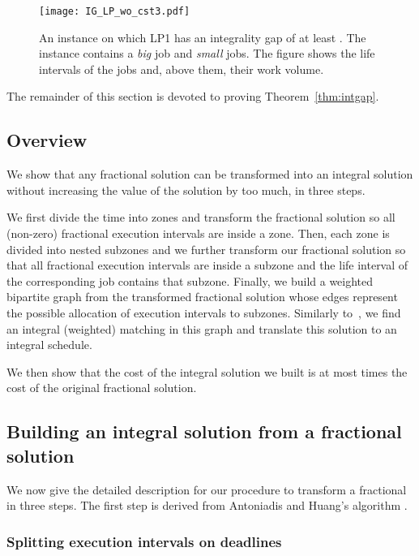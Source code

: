 \begin{figure}
   \begin{center}
        \texttt{[image: IG\_LP\_wo\_cst3.pdf]}
   \end{center}
   \caption{An instance on which LP1 has an integrality gap of at least .
   The instance contains a \emph{big} job and  \emph{small} jobs. The figure shows the life intervals of the jobs
   and, above them, their work volume.}
   \label{fig:exmpl_LP}
\end{figure}


The remainder of this section is devoted to proving Theorem~\ref{thm:intgap}.

\subsection{Overview}

We show that any fractional solution can be transformed into an integral solution without increasing the value of the solution by too much, in three steps. 

We first divide the time into zones and transform the fractional solution so all (non-zero) fractional execution intervals are inside a zone. Then, each zone is divided into nested subzones and we further transform our fractional solution so that all fractional execution intervals are inside a subzone and the life interval of the corresponding job contains that subzone. Finally, we build a weighted bipartite graph from the transformed fractional solution whose edges represent the possible allocation of execution intervals to subzones. Similarly to~\cite{Shmoys_Tardos}, we find an integral (weighted) matching in this graph and translate this solution to an integral schedule.

We then show that the cost of the integral solution we built is at most  times the cost of the original fractional solution.



\subsection{Building an integral solution from a fractional solution}

We now give the detailed description for our procedure to transform a fractional in three steps. The first step is derived from Antoniadis and Huang's algorithm \cite{Antoniadis_Huang}. 

\subsubsection{Splitting execution intervals on deadlines}

